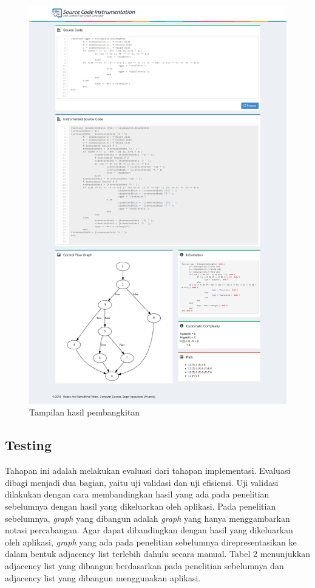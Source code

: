 \begin{figure}[h!]
	\centering
	\includegraphics[width=0.9\linewidth]{gambar/implementasiantarmuka}
	\caption{Tampilan hasil pembangkitan}
	\label{fig:implementasiantarmuka}
\end{figure}

\subsection*{Testing}

Tahapan ini adalah melakukan evaluasi dari tahapan implementasi. Evaluasi dibagi menjadi dua bagian, yaitu uji validasi dan uji efisiensi. Uji validasi dilakukan dengan cara membandingkan hasil yang ada pada penelitian sebelumnya dengan hasil yang dikeluarkan oleh aplikasi. Pada penelitian sebelumnya, \textit{graph} yang dibangun adalah \textit{graph} yang hanya menggambarkan notasi percabangan. Agar dapat dibandingkan dengan hasil yang dikeluarkan oleh aplikasi, \textit{graph} yang ada pada penelitian sebelumnya direpresentasikan ke dalam bentuk adjacency list terlebih dahulu secara manual. Tabel 2 menunjukkan adjacency list yang dibangun berdasarkan pada penelitian sebelumnya dan adjacency list yang dibangun menggunakan aplikasi. 



